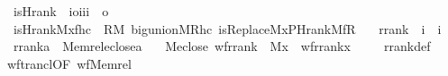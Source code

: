 \begin{isabellebody}
\isanewline
{}\isamarkupfalse%
\isanewline
\ \ is{\isacharunderscore}{\kern0pt}Hrank\ {\isacharcolon}{\kern0pt}{\isacharcolon}{\kern0pt}\ {\isachardoublequoteopen}{\isacharbrackleft}{\kern0pt}i{\isasymRightarrow}o{\isacharcomma}{\kern0pt}i{\isacharcomma}{\kern0pt}i{\isacharcomma}{\kern0pt}i{\isacharbrackright}{\kern0pt}\ {\isasymRightarrow}\ o{\isachardoublequoteclose}\ \isanewline
\ \ {\isachardoublequoteopen}is{\isacharunderscore}{\kern0pt}Hrank{\isacharparenleft}{\kern0pt}M{\isacharcomma}{\kern0pt}x{\isacharcomma}{\kern0pt}f{\isacharcomma}{\kern0pt}hc{\isacharparenright}{\kern0pt}\ {\isasymequiv}\ {\isacharparenleft}{\kern0pt}{\isasymexists}R{\isacharbrackleft}{\kern0pt}M{\isacharbrackright}{\kern0pt}{\isachardot}{\kern0pt}\ big{\isacharunderscore}{\kern0pt}union{\isacharparenleft}{\kern0pt}M{\isacharcomma}{\kern0pt}R{\isacharcomma}{\kern0pt}hc{\isacharparenright}{\kern0pt}\ {\isasymand}is{\isacharunderscore}{\kern0pt}Replace{\isacharparenleft}{\kern0pt}M{\isacharcomma}{\kern0pt}x{\isacharcomma}{\kern0pt}PHrank{\isacharparenleft}{\kern0pt}M{\isacharcomma}{\kern0pt}f{\isacharparenright}{\kern0pt}{\isacharcomma}{\kern0pt}R{\isacharparenright}{\kern0pt}{\isacharparenright}{\kern0pt}\ {\isachardoublequoteclose}\isanewline
\isanewline
{}\isamarkupfalse%
\isanewline
\ \ rrank\ {\isacharcolon}{\kern0pt}{\isacharcolon}{\kern0pt}\ {\isachardoublequoteopen}i\ {\isasymRightarrow}\ i{\isachardoublequoteclose}\ \isanewline
\ \ {\isachardoublequoteopen}rrank{\isacharparenleft}{\kern0pt}a{\isacharparenright}{\kern0pt}\ {\isasymequiv}\ Memrel{\isacharparenleft}{\kern0pt}eclose{\isacharparenleft}{\kern0pt}{\isacharbraceleft}{\kern0pt}a{\isacharbraceright}{\kern0pt}{\isacharparenright}{\kern0pt}{\isacharparenright}{\kern0pt}{\isacharcircum}{\kern0pt}{\isacharplus}{\kern0pt}{\isachardoublequoteclose}\ \isanewline
\isanewline
{}\isamarkupfalse%
\ {\isacharparenleft}{\kern0pt}\ M{\isacharunderscore}{\kern0pt}eclose{\isacharparenright}{\kern0pt}\ wf{\isacharunderscore}{\kern0pt}rrank\ {\isacharcolon}{\kern0pt}\ {\isachardoublequoteopen}M{\isacharparenleft}{\kern0pt}x{\isacharparenright}{\kern0pt}\ {\isasymLongrightarrow}\ wf{\isacharparenleft}{\kern0pt}rrank{\isacharparenleft}{\kern0pt}x{\isacharparenright}{\kern0pt}{\isacharparenright}{\kern0pt}{\isachardoublequoteclose}\ \isanewline
%
\isadelimproof
\ \ %
\endisadelimproof
%
\isatagproof
{}\isamarkupfalse%
\ rrank{\isacharunderscore}{\kern0pt}def\ \isamarkupfalse%
\ wf{\isacharunderscore}{\kern0pt}trancl{\isacharbrackleft}{\kern0pt}OF\ wf{\isacharunderscore}{\kern0pt}Memrel{\isacharbrackright}{\kern0pt}\ \isacommand{{\isachardot}{\kern0pt}}\isamarkupfalse%

\end{isabellebody}
